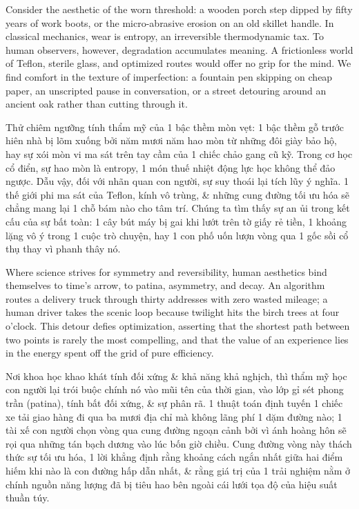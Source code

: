 \documentclass[11pt]{article}
\begin{document}
Consider the aesthetic of the worn threshold: a wooden porch step dipped by fifty years of work boots, or the micro-abrasive erosion on an old skillet handle. In classical mechanics, wear is entropy, an irreversible thermodynamic tax. To human observers, however, degradation accumulates meaning. A frictionless world of Teflon, sterile glass, and optimized routes would offer no grip for the mind. We find comfort in the texture of imperfection: a fountain pen skipping on cheap paper, an unscripted pause in conversation, or a street detouring around an ancient oak rather than cutting through it.

Thử chiêm ngưỡng tính thẩm mỹ của 1 bậc thềm mòn vẹt: 1 bậc thềm gỗ trước hiên nhà bị lõm xuống bởi năm mươi năm hao mòn từ những đôi giày bảo hộ, hay sự xói mòn vi ma sát trên tay cầm của 1 chiếc chảo gang cũ kỹ. Trong cơ học cổ điển, sự hao mòn là entropy, 1 món thuế nhiệt động lực học không thể đảo ngược. Dẫu vậy, đối với nhãn quan con người, sự suy thoái lại tích lũy ý nghĩa. 1 thế giới phi ma sát của Teflon, kính vô trùng, \& những cung đường tối ưu hóa sẽ chẳng mang lại 1 chỗ bám nào cho tâm trí. Chúng ta tìm thấy sự an ủi trong kết cấu của sự bất toàn: 1 cây bút máy bị gai khi lướt trên tờ giấy rẻ tiền, 1 khoảng lặng vô ý trong 1 cuộc trò chuyện, hay 1 con phố uốn lượn vòng qua 1 gốc sồi cổ thụ thay vì phanh thây nó.

Where science strives for symmetry and reversibility, human aesthetics bind themselves to time's arrow, to patina, asymmetry, and decay. An algorithm routes a delivery truck through thirty addresses with zero wasted mileage; a human driver takes the scenic loop because twilight hits the birch trees at four o'clock. This detour defies optimization, asserting that the shortest path between two points is rarely the most compelling, and that the value of an experience lies in the energy spent off the grid of pure efficiency.

Nơi khoa học khao khát tính đối xứng \& khả năng khả nghịch, thì thẩm mỹ học con người lại trói buộc chính nó vào mũi tên của thời gian, vào lớp gỉ sét phong trần (patina), tính bất đối xứng, \& sự phân rã. 1 thuật toán định tuyến 1 chiếc xe tải giao hàng đi qua ba mươi địa chỉ mà không lãng phí 1 dặm đường nào; 1 tài xế con người chọn vòng qua cung đường ngoạn cảnh bởi vì ánh hoàng hôn sẽ rọi qua những tán bạch dương vào lúc bốn giờ chiều. Cung đường vòng này thách thức sự tối ưu hóa, 1 lời khẳng định rằng khoảng cách ngắn nhất giữa hai điểm hiếm khi nào là con đường hấp dẫn nhất, \& rằng giá trị của 1 trải nghiệm nằm ở chính nguồn năng lượng đã bị tiêu hao bên ngoài cái lưới tọa độ của hiệu suất thuần túy.
\end{document}
